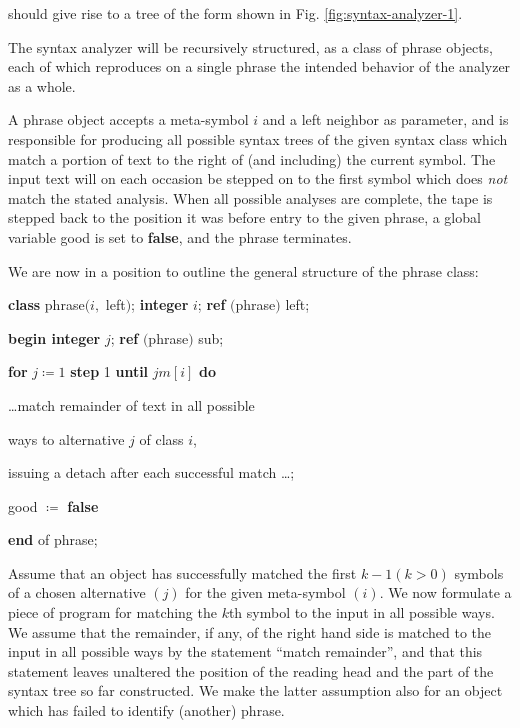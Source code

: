\noindent
should give rise to a tree of the form shown in Fig. \ref{fig:syntax-analyzer-1}.

The syntax analyzer will be recursively structured, as a class of phrase objects, each of which reproduces on a single phrase the intended behavior of the analyzer as a whole.

A phrase object accepts a meta-symbol $i$ and a left neighbor as parameter, and is responsible for producing all possible syntax trees of the given syntax class which match a portion of text to the right of (and including) the current symbol. The input text will on each occasion be stepped on to the first symbol which does \textit{not} match the stated analysis. When all possible analyses are complete, the tape is stepped back to the position it was before entry to the given phrase, a global variable good is set to \textbf{false}, and the phrase terminates.

We are now in a position to outline the general structure of the phrase class:

\quad \textbf{class} phrase$(i,$ left$)$; \textbf{integer} $i$; \textbf{ref} $($phrase$)$ left;

\quad \quad \textbf{begin integer} $j$; \textbf{ref} $($phrase$)$ sub;

\quad \quad \quad \textbf{for} $j\coloneq 1$ \textbf{step} 1 \textbf{until} $jm[i]$ \textbf{do}

\quad \quad \quad \quad \dots match remainder of text in all possible

\quad \quad \quad \quad ways to alternative $j$ of class $i$,

\quad \quad \quad \quad issuing a detach after each successful match \dots;

\quad \quad \quad good $\coloneq$ \textbf{false}

\quad \textbf{end} of phrase;

Assume that an object has successfully matched the first $k - 1(k > 0)$ symbols of a chosen alternative $(j)$ for the given meta-symbol $(i)$. We now formulate a piece of program for matching the $k$th symbol to the input in all possible ways. We assume that the remainder, if any, of the right hand side is matched to the input in all possible ways by the statement ``match remainder'', and that this statement leaves unaltered the position of the reading head and the part of the syntax tree so far constructed. We make the latter assumption also for an object which has failed to identify (another) phrase.

